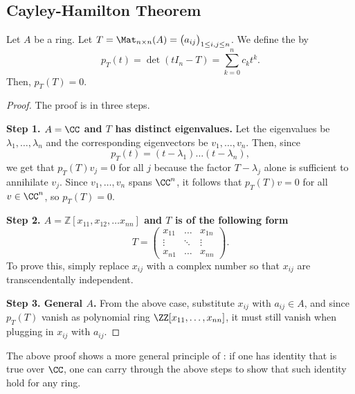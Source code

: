 \subsection{Cayley-Hamilton Theorem}
\begin{theorem}
    \label{thm:cayley_hamilton}
    Let $A$ be a ring. Let $T=\Mat_{n\times n}(A) = \big(a_{ij}\big)_{1\leq i,j\leq n}$.
    We define the 
    by 
    $$p_T(t) = \det(tI_n-T)=\sum_{k=0}^n c_k t^k.$$ 
    Then, $p_T(T) = 0$.
\end{theorem}
\begin{proof}
    The proof is in three steps.

    \textbf{Step 1. $A=\CC$ and $T$ has distinct eigenvalues.}
    Let the eigenvalues be $\lambda_1,\dots,\lambda_n$
    and the corresponding eigenvectors be $v_1,\dots,v_n$.
    Then, since
    $$p_T(t) = (t-\lambda_1)\dots (t-\lambda_n),$$
    we get that $p_T(T)v_j = 0$ for all $j$ because the factor
    $T-\lambda_j$ alone is sufficient to annihilate $v_j$.
    Since $v_1,\dots,v_n$ spans $\CC^n$,
    it follows that $p_T(T)v=0$ for all $v\in\CC^n$,
    so $p_T(T)=0$.
    
    \textbf{Step 2. $A=\mathbb Z[x_{11},x_{12},
    \dots x_{nn}]$ and $T$ is of the following form}
    $$T = \begin{pmatrix}
	x_{11} & \dots & x_{1n} \\
	\vdots & \ddots & \vdots \\
	x_{n1} & \dots & x_{nn}
    \end{pmatrix}.$$
    To prove this, simply replace $x_{ij}$
    with a complex number so that $x_{ij}$ are
    transcendentally independent.

    \textbf{Step 3. General $A$.}
    From the above case, substitute 
    $x_{ij}$ with $a_{ij}\in A$, and since 
    $p_T(T)$ vanish as polynomial ring $\ZZ[x_{11},
    \dots,x_{nn}]$, it must still vanish when plugging in
    $x_{ij}$ with $a_{ij}$.
\end{proof}
The above proof shows a more general principle of 
:
if one has identity that is true over $\CC$,
one can carry through the above steps to show
that such identity hold for any ring.

